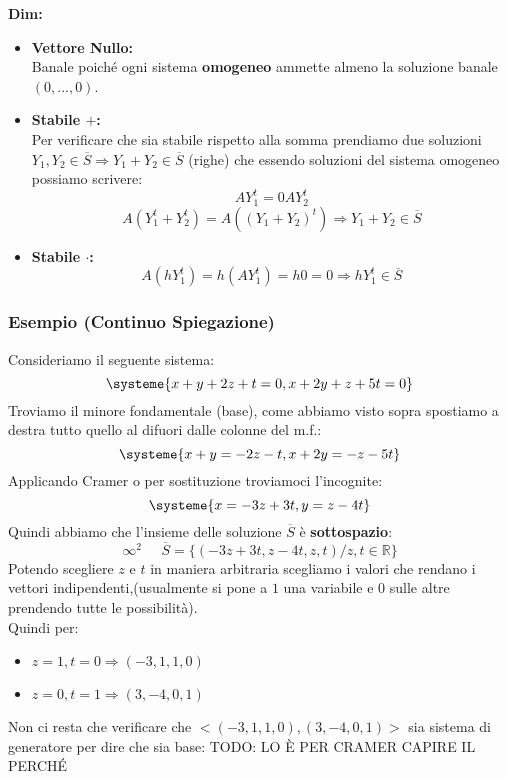 \textbf{Dim:}
\begin{itemize}

\item[] \textbf{Vettore Nullo:}\\
Banale poiché ogni sistema \textbf{omogeneo} ammette almeno la soluzione banale $(0,...,0)$.

\item[] \textbf{Stabile $+$:}\\
Per verificare che sia stabile rispetto alla somma prendiamo due soluzioni $Y_1,Y_2 \in \overline{S} \Rightarrow Y_1+Y_2 \in \overline{S}$ (righe) che essendo soluzioni del sistema omogeneo possiamo scrivere:
$$AY_1^t = 0 AY_2^t$$
$$A(Y_1^t+Y_2^t) = A((Y_1+Y_2)^t) \Rightarrow Y_1+Y_2 \in \overline{S} $$
\item[] \textbf{Stabile $\cdot$:}\\
$$ A(hY_1^t) = h(AY_1^t) = h0 = 0 \Rightarrow hY_1^t \in \overline{S} $$
\end{itemize}

\subsubsection{Esempio (Continuo Spiegazione)}
Consideriamo il seguente sistema:
$$ 
\systeme
{
x+y+2z+t=0,
x+2y+z+5t=0
}
$$
Troviamo il minore fondamentale (base), come abbiamo visto sopra spostiamo a destra tutto quello al difuori dalle colonne del m.f.:
$$
\systeme
{
x+y = -2z-t,
x+2y= -z-5t
} 
$$
Applicando Cramer o per sostituzione troviamoci l'incognite:
$$
\systeme
{
x = -3z+3t,
y = z-4t
}
$$
Quindi abbiamo che l'insieme delle soluzione $\overline{S}$ è \textbf{sottospazio}:
$$ \infty^2 \;\;\;\;\; \overline{S}=\{(-3z+3t,z-4t,z,t)/ z,t \in \mathbb{R}\} $$
Potendo scegliere $z$ e $t$ in maniera arbitraria scegliamo i valori che rendano i vettori indipendenti,(usualmente si pone a $1$ una variabile e $0$ sulle altre prendendo tutte le possibilità).\\
Quindi per:
\begin{itemize}
\item[]$z=1,t=0 \Rightarrow (-3,1,1,0)$
\item[]$z=0,t=1 \Rightarrow (3,-4,0,1)$
\end{itemize}
Non ci resta che verificare che $<(-3,1,1,0),(3,-4,0,1)>$ sia sistema di generatore per dire che sia base:
TODO: LO È PER CRAMER CAPIRE IL PERCHÉ

